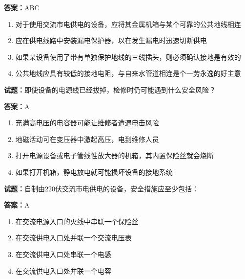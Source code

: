 \documentclass{ctexbook}
\begin{document}
\textbf{答案：}ABC 

\begin{enumerate}[leftmargin=3em]
  \item 对于使用交流市电供电的设备，应将其金属机箱与某个可靠的公共地线相连 

  \item 应在供电线路中安装漏电保护器，以在发生漏电时迅速切断供电 

  \item 如果某设备使用了带有单独保护地线的三线插头，则必须确认接地是有效的 

  \item 公共地线应具有较低的接地电阻，与自来水管道相连是个一劳永逸的好主意 

\end{enumerate}





\vspace{1em}

\textbf{试题：}即使设备的电源线已经拔掉，检修时仍可能遇到什么安全风险？ 

\textbf{答案：}A 

\begin{enumerate}[leftmargin=3em]
  \item 充满高电压的电容器可能让维修者遭遇电击风险 

  \item 地磁活动可在变压器中激起高压，电到维修人员 

  \item 打开电源设备或电子管线性放大器的机箱，其内置保险丝就会烧断 

  \item 如果打开机箱，静电放电就可能损坏设备的接地系统 

\end{enumerate}





\vspace{1em}

\textbf{试题：}自制由220伏交流市电供电的设备，安全措施应至少包括： 

\textbf{答案：}A 

\begin{enumerate}[leftmargin=3em]
  \item 在交流电源入口的火线中串联一个保险丝 

  \item 在交流供电入口处并联一个交流电压表 

  \item 在交流供电入口处串联一个电感 

  \item 在交流供电入口处并联一个电容 

\end{enumerate}
\end{document}
